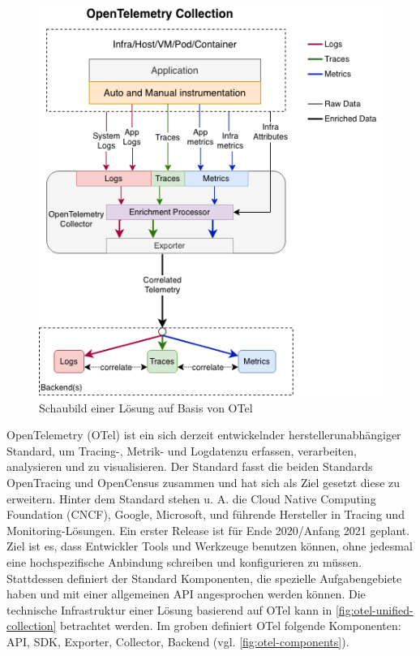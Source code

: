 \begin{figure}
\centering
\includegraphics[width=\linewidth]{img/03_methoden/otel_unified-collection.png}
\caption{Schaubild einer Lösung auf Basis von OTel \cite{OpenTelemetryUnifiedCollection}}
\label{fig:otel-unified-collection}
\end{figure}

OpenTelemetry (OTel) \cite{OpenTelemetry} ist ein sich derzeit entwickelnder herstellerunabhängiger Standard, um Tracing-, Metrik- und Logdaten\footnotemark zu erfassen, verarbeiten, analysieren und zu visualisieren. Der Standard fasst die beiden Standards OpenTracing und OpenCensus \cite{OpenCensus} zusammen und hat sich als Ziel gesetzt diese zu erweitern. Hinter dem Standard stehen u. A. die Cloud Native Computing Foundation (CNCF), Google, Microsoft, und führende Hersteller in Tracing und Monitoring-Lösungen. Ein erster Release ist für Ende 2020/Anfang 2021 geplant. Ziel ist es, dass Entwickler Tools und Werkzeuge benutzen können, ohne jedesmal eine hochspezifische Anbindung schreiben und konfigurieren zu müssen. Stattdessen definiert der Standard Komponenten, die spezielle Aufgabengebiete haben und mit einer allgemeinen API angesprochen werden können. Die technische Infrastruktur einer Lösung basierend auf OTel kann in \autoref{fig:otel-unified-collection} betrachtet werden. Im groben definiert OTel folgende Komponenten: API, SDK, Exporter, Collector, Backend (vgl. \autoref{fig:otel-components}).

